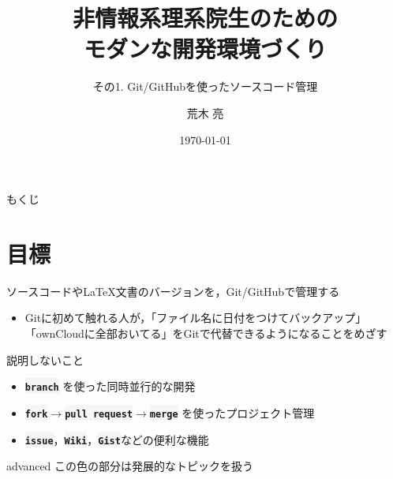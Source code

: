 \documentclass[12pt,dvipdfmx,svgnames,uplatex,aspectratio=169]{beamer}
\title{非情報系理系院生のための \\
  モダンな開発環境づくり}
\subtitle{その1. Git/GitHubを使ったソースコード管理}
\author{荒木 亮}
\institute{阪大院基礎工・後藤研}
\date{\today}
\newcommand{\git}[1]{{\colorbox{WhiteSmoke}{\texttt{\textbf{#1}}}}}  %
\begin{document}
\frame{\maketitle}
\begin{frame}{もくじ}
  \tableofcontents
\end{frame}

\section{目標}
\begin{frame}{\insertsection}
  \begin{screen}
    \centering
    ソースコードやLaTeX文書のバージョンを，Git/GitHubで管理する
  \end{screen}

  \begin{itemize}
    \item Gitに初めて触れる人が，「ファイル名に日付をつけてバックアップ」\\「ownCloudに全部おいてる」をGitで代替できるようになることをめざす
  \end{itemize}

  \pause
  \begin{alertblock}{説明しないこと}
    \begin{itemize}
      \item \git{branch} を使った同時並行的な開発
      \item \git{fork}\(\to\)\git{pull request}\(\to\)\git{merge} を使ったプロジェクト管理
      \item \git{issue}，\git{Wiki}，\git{Gist}などの便利な機能
    \end{itemize}
    \begin{beamercolorbox}[rounded=true]{advanced}
      \footnotesize{この色の部分は発展的なトピックを扱う}
    \end{beamercolorbox}
  \end{alertblock}
\end{frame}
\end{document}
